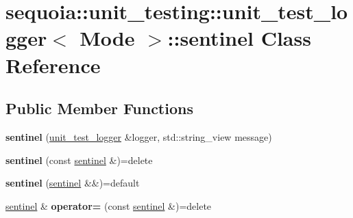 \hypertarget{classsequoia_1_1unit__testing_1_1unit__test__logger_1_1sentinel}{}\section{sequoia\+::unit\+\_\+testing\+::unit\+\_\+test\+\_\+logger$<$ Mode $>$\+::sentinel Class Reference}
\label{classsequoia_1_1unit__testing_1_1unit__test__logger_1_1sentinel}
\subsection*{Public Member Functions}
\begin{DoxyCompactItemize}
\item 
\mbox{\label{classsequoia_1_1unit__testing_1_1unit__test__logger_1_1sentinel_a34702a2f83415d1fc51867a63830cac9}} 
{\bfseries sentinel} (\mbox{\hyperlink{classsequoia_1_1unit__testing_1_1unit__test__logger}{unit\+\_\+test\+\_\+logger}} \&logger, std\+::string\+\_\+view message)
\item 
\mbox{\label{classsequoia_1_1unit__testing_1_1unit__test__logger_1_1sentinel_a4931db0788cdb7219543f1721fdd244e}} 
{\bfseries sentinel} (const \mbox{\hyperlink{classsequoia_1_1unit__testing_1_1unit__test__logger_1_1sentinel}{sentinel}} \&)=delete
\item 
\mbox{\label{classsequoia_1_1unit__testing_1_1unit__test__logger_1_1sentinel_a316bc3bf2fef4d1775bcbf43ac25891a}} 
{\bfseries sentinel} (\mbox{\hyperlink{classsequoia_1_1unit__testing_1_1unit__test__logger_1_1sentinel}{sentinel}} \&\&)=default
\item 
\mbox{\label{classsequoia_1_1unit__testing_1_1unit__test__logger_1_1sentinel_aafff9fadcac6e5ee131dcca107f53e99}} 
\mbox{\hyperlink{classsequoia_1_1unit__testing_1_1unit__test__logger_1_1sentinel}{sentinel}} \& {\bfseries operator=} (const \mbox{\hyperlink{classsequoia_1_1unit__testing_1_1unit__test__logger_1_1sentinel}{sentinel}} \&)=delete
\item 

\end{DoxyCompactItemize}
